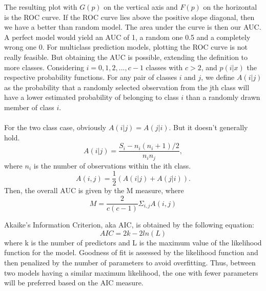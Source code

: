     The resulting plot with $G(p)$ on the vertical axis and $F(p)$ on 
    the horizontal is the ROC curve. If the ROC curve lies above the 
    positive slope diagonal, then we have a better than random model. 
    The area under the curve is then our AUC. A perfect model would 
    yield an AUC of 1, a random one 0.5 and a completely wrong one 0.
    For multiclass prediction models, plotting the ROC curve is not 
    really feasible. But obtaining the AUC is possible, extending the 
    definition to more classes. Considering $i=0,1,2,...,c-1$ classes 
    with $c>2$, and $p(i|x)$ the respective probability functions. 
    For any pair of classes $i$ and $j$, we define $A(i|j)$ as the 
    probability that a randomly selected observation from the jth class 
    will have a lower estimated probability of belonging to class $i$ 
    than a randomly drawn member of class $i$.
    \\\\
    For the two class case, obviously $A(i|j) = A(j|i)$. But it 
    doesn't generally hold.
    \begin{equation}
        A(i|j)=\frac{S_i-n_i(n_i+1)/2}{n_in_j},  
    \end{equation}
    where $n_i$ is the number of observations within the ith class.
    \begin{equation}
        A(i,j) = \frac{1}{2}(A(i|j)+A(j|i)).   
    \end{equation}
    Then, the overall AUC is given by the M measure, where 
    \begin{equation}
        M=\frac{2}{c(c-1)}\Sigma_{i,j}A(i,j)
    \end{equation}
    
    
    Akaike's Information Criterion, aka AIC, is obtained by the 
    following equation:
    \begin{equation}
        AIC = 2k-2ln(L)  
    \end{equation}
    where k is the number of predictors and L is the maximum value 
    of the likelihood function for the model. Goodness of fit is 
    assessed by the likelihood function and then penalized by the 
    number of parameters to avoid overfitting. Thus, between two models 
    having a similar maximum likelihood, the one with fewer parameters 
    will be preferred based on the AIC measure.